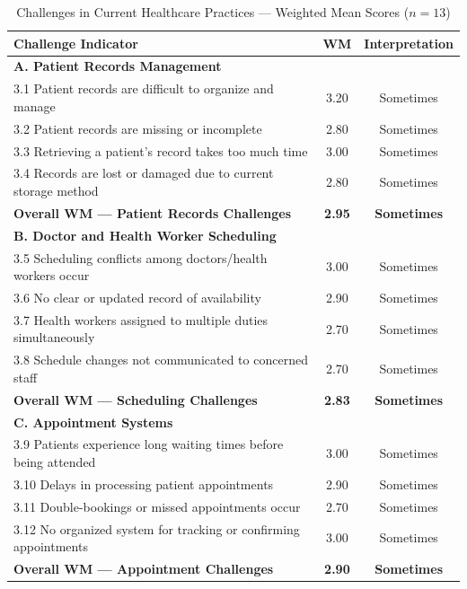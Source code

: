 \documentclass{research}
\begin{document}
\begin{table}[H]
  \centering
  \caption{Challenges in Current Healthcare Practices --- Weighted Mean Scores ($n = 13$)}
  \label{tab:challenges}
  \begin{tabular}{p{9cm}cc}
    \toprule
    \textbf{Challenge Indicator} & \textbf{WM} & \textbf{Interpretation} \\
    \midrule
    \multicolumn{3}{l}{\textbf{A. Patient Records Management}} \\
    3.1 Patient records are difficult to organize and manage        & 3.20 & Sometimes \\
    3.2 Patient records are missing or incomplete                   & 2.80 & Sometimes \\
    3.3 Retrieving a patient's record takes too much time           & 3.00 & Sometimes \\
    3.4 Records are lost or damaged due to current storage method   & 2.80 & Sometimes \\
    \textbf{Overall WM --- Patient Records Challenges}              & \textbf{2.95} & \textbf{Sometimes} \\
    \midrule
    \multicolumn{3}{l}{\textbf{B. Doctor and Health Worker Scheduling}} \\
    3.5 Scheduling conflicts among doctors/health workers occur     & 3.00 & Sometimes \\
    3.6 No clear or updated record of availability                  & 2.90 & Sometimes \\
    3.7 Health workers assigned to multiple duties simultaneously   & 2.70 & Sometimes \\
    3.8 Schedule changes not communicated to concerned staff        & 2.70 & Sometimes \\
    \textbf{Overall WM --- Scheduling Challenges}                   & \textbf{2.83} & \textbf{Sometimes} \\
    \midrule
    \multicolumn{3}{l}{\textbf{C. Appointment Systems}} \\
    3.9 Patients experience long waiting times before being attended & 3.00 & Sometimes \\
    3.10 Delays in processing patient appointments                  & 2.90 & Sometimes \\
    3.11 Double-bookings or missed appointments occur               & 2.70 & Sometimes \\
    3.12 No organized system for tracking or confirming appointments & 3.00 & Sometimes \\
    \textbf{Overall WM --- Appointment Challenges}                  & \textbf{2.90} & \textbf{Sometimes} \\
    \bottomrule
  \end{tabular}
\end{table}
\end{document}
